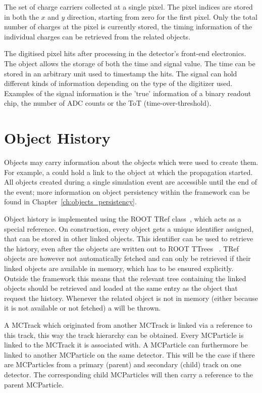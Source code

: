 The set of charge carriers collected at a single pixel.
The pixel indices are stored in both the $x$ and $y$ direction, starting from zero for the first pixel.
Only the total number of charges at the pixel is currently stored, the timing information of the individual charges can be retrieved from the related  objects.

The digitised pixel hits after processing in the detector's front-end electronics.
The object allows the storage of both the time and signal value.
The time can be stored in an arbitrary unit used to timestamp the hits.
The signal can hold different kinds of information depending on the type of the digitizer used.
Examples of the signal information is the 'true' information of a binary readout chip, the number of ADC counts or the ToT (time-over-threshold).

\section{Object History}
\label{sec:objhistory}

Objects may carry information about the objects which were used to create them.
For example, a  could hold a link to the  object at which the propagation started.
All objects created during a single simulation event are accessible until the end of the event; more information on object persistency within the framework can be found in Chapter~\ref{ch:objects_persistency}.

Object history is implemented using the ROOT TRef class~\cite{roottref}, which acts as a special reference.
On construction, every object gets a unique identifier assigned, that can be stored in other linked objects.
This identifier can be used to retrieve the history, even after the objects are written out to ROOT TTrees ~\cite{roottree}.
TRef objects are however not automatically fetched and can only be retrieved if their linked objects are available in memory, which has to be ensured explicitly.
Outside the framework this means that the relevant tree containing the linked objects should be retrieved and loaded at the same entry as the object that request the history.
Whenever the related object is not in memory (either because it is not available or not fetched) a  will be thrown.

A MCTrack which originated from another MCTrack is linked via a reference to this track, this way the track hierarchy can be obtained.
Every MCParticle is linked to the MCTrack it is associated with.
A MCParticle can furthermore be linked to another MCParticle on the same detector.
This will be the case if there are MCParticles from a primary (parent) and secondary (child) track on one detector.
The corresponding child MCParticles will then carry a reference to the parent MCParticle.
